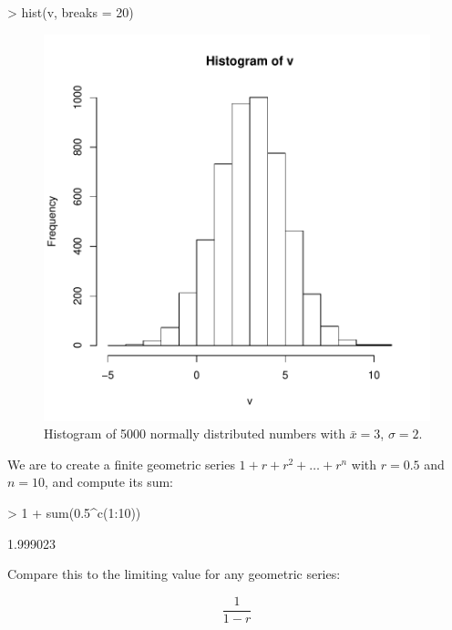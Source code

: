 \documentclass[11pt, oneside, reqno]{article}
\begin{document}
\begin{Schunk}
\begin{Sinput}
> hist(v, breaks = 20)
\end{Sinput}
\end{Schunk}

\begin{figure}
\begin{center}
\includegraphics{exercises-fivethousandrnorm}
\end{center}
\caption{Histogram of 5000 normally distributed numbers with $\bar{x}=3$, $\sigma=2$.}
\label{fig:fivethousand}
\end{figure}
\eans

We are to create a finite geometric series $1+r+r^2+\ldots+r^n$ with $r=0.5$ and $n=10$, and compute its sum:

\begin{Schunk}
\begin{Sinput}
> 1 + sum(0.5^c(1:10))
\end{Sinput}
\begin{Soutput}
[1] 1.999023
\end{Soutput}
\end{Schunk}

Compare this to the limiting value for any geometric series:

\[
\frac{1}{1-r}
\]
\end{document}
